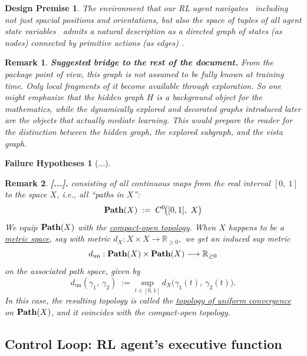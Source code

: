 \documentclass[11pt]{article}
\newtheorem{remark}{Remark}[subsection]
\newtheorem{premise}{Design Premise}
\newtheorem{failure}{Failure Hypotheses}
\begin{document}
\begin{premise}
The environment that our RL agent navigates \textemdash\ including not just spacial positions and orientations, but also the space of tuples of all agent state variables \textemdash\ admits a natural description as a directed graph of states (as nodes) connected by primitive actions (as edges) \cite[\S2]{Diet} \cite[\S1]{SPS}.
\end{premise}

{\color{blue}
\begin{remark}
{\bf Suggested bridge to the rest of the document.}
\normalfont
From the package point of view, this graph is not assumed to be fully known at training time. Only local fragments of it become available through exploration. So one might emphasize that the hidden graph $H$ is a background object for the mathematics, while the dynamically explored and decorated graphs introduced later are the objects that actually mediate learning. This would prepare the reader for the distinction between the hidden graph, the explored subgraph, and the vista graph.
\end{remark}
}

\begin{failure}
[...]
\end{failure}


\begin{remark}
{\bf [...].}
\normalfont
 consisting of all continuous maps from the real interval $[0,\ 1]$ to the space $X$, i.e., all ``paths in $X$'':
$$
\bold{Path}(X)\;:=\;C^{0\!}\big([0,1],\ X\big)
$$
We equip $\bold{Path}(X)$ with the \href{https://en.wikipedia.org/wiki/Compact-open_topology}{{\em compact-open topology}}. When $X$ happens to be a \href{https://en.wikipedia.org/wiki/Metric_space}{{\em metric space}}, say with metric
$
d_{X}:X\!\times\!X\longrightarrow\mathbb{R}_{\ge0},
$
we get an induced {\em sup metric}
$$
d_{\text{un}}:\bold{Path}(X)\times\bold{Path}(X)\longrightarrow\mathbb{R}_{\ge0}
$$
on the associated path space, given by
$$
d_\text{un}(\gamma_{1},\ \!\gamma_{2})
\;:=\;
\underset{t\in[0,1]}{\text{sup}}
\ d_{X\!}\big(\gamma_{1\!}(t),\ \!\gamma_{2}(t)\big).
$$
In this case, the resulting topology is called the \href{https://en.wikipedia.org/wiki/Uniform_convergence}{\em topology of uniform convergence} on $\bold{Path}(X)$, and it coincides with the compact-open topology.

\end{remark}


\subsection{Control Loop: RL agent's executive function}
\end{document}
